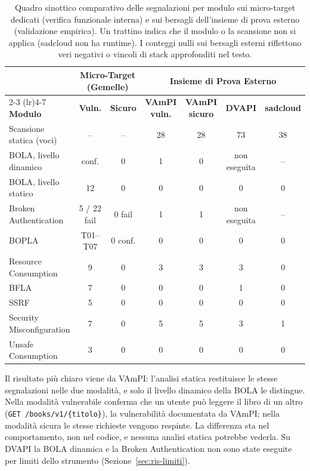 \begin{table}[htbp]
  \centering
  \small
  \linespread{1.05}\selectfont
  \setlength{\tabcolsep}{4.5pt}
  \begin{tabular}{@{}lcccccc@{}}
    \toprule
    & \multicolumn{2}{c}{\textbf{Micro-Target (Gemelle)}} & \multicolumn{4}{c}{\textbf{Insieme di Prova Esterno}} \\
    \cmidrule(lr){2-3} \cmidrule(lr){4-7}
    \textbf{Modulo} & \textbf{Vuln.} & \textbf{Sicuro} & \textbf{VAmPI vuln.} & \textbf{VAmPI sicuro} & \textbf{DVAPI} & \textbf{sadcloud} \\
    \midrule
    Scansione statica (voci) & -- & -- & 28 & 28 & 73 & 38 \\
    BOLA, livello dinamico & conf. & 0 & 1 & 0 & non eseguita & -- \\
    BOLA, livello statico & 12 & 0 & 0 & 0 & 0 & 0 \\
    Broken Authentication & 5 / 22 fail & 0 fail & 1 & 1 & non eseguita & -- \\
    BOPLA & T01--T07 & 0 conf. & 0 & 0 & 0 & 0 \\
    Resource Consumption & 9 & 0 & 3 & 3 & 3 & 0 \\
    BFLA & 7 & 0 & 0 & 0 & 1 & 0 \\
    SSRF & 5 & 0 & 0 & 0 & 0 & 0 \\
    Security Misconfiguration & 7 & 0 & 5 & 5 & 3 & 1 \\
    Unsafe Consumption & 3 & 0 & 0 & 0 & 0 & 0 \\
    \bottomrule
  \end{tabular}
  \caption[Quadro sinottico comparativo dei risultati]{Quadro sinottico comparativo
    delle segnalazioni per modulo sui micro-target dedicati (verifica funzionale interna)
    e sui bersagli dell'insieme di prova esterno (validazione empirica). Un trattino
    indica che il modulo o la scansione non si applica (sadcloud non ha runtime).
    I conteggi nulli sui bersagli esterni riflettono veri negativi o vincoli di stack
    approfonditi nel testo.}
  \label{tab:ris-prova}
\end{table}

Il risultato più chiaro viene da VAmPI: l'analisi statica restituisce le
stesse segnalazioni nelle due modalità, e solo il livello dinamico della BOLA
le distingue. Nella modalità vulnerabile conferma che un utente può leggere il
libro di un altro (\texttt{GET /books/v1/\{titolo\}}), la vulnerabilità
documentata da VAmPI; nella modalità sicura le stesse richieste vengono
respinte. La differenza sta nel comportamento, non nel codice, e nessuna
analisi statica potrebbe vederla. Su DVAPI la BOLA dinamica e la Broken
Authentication non sono state eseguite per limiti dello strumento
(Sezione~\ref{sec:ris-limiti}).

